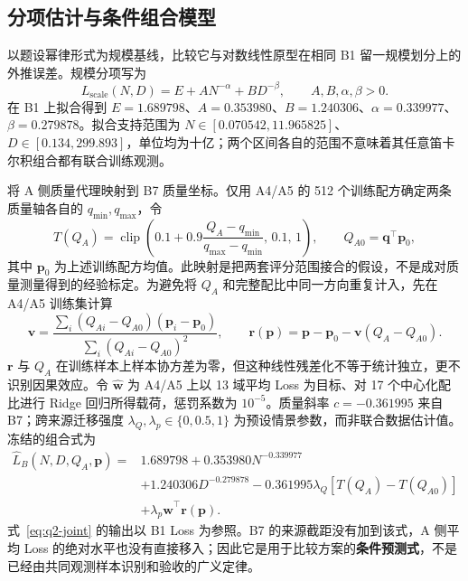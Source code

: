 \subsection{分项估计与条件组合模型}

以题设幂律形式为规模基线，比较它与对数线性原型在相同 B1 留一规模划分上的外推误差。规模分项写为
\begin{equation}
L_{\mathrm{scale}}(N,D)=E+AN^{-\alpha}+BD^{-\beta},\qquad A,B,\alpha,\beta>0.
\label{eq:q2-scale}
\end{equation}
在 B1 上拟合得到 $E=1.689798$、$A=0.353980$、$B=1.240306$、$\alpha=0.339977$、$\beta=0.279878$。拟合支持范围为 $N\in[0.070542,11.965825]$、$D\in[0.134,299.893]$，单位均为十亿；两个区间各自的范围不意味着其任意笛卡尔积组合都有联合训练观测。

将 A 侧质量代理映射到 B7 质量坐标。仅用 A4/A5 的 512 个训练配方确定两条质量轴各自的 $q_{\min},q_{\max}$，令
\begin{equation}
T(Q_A)=\operatorname{clip}\!\left(0.1+0.9\frac{Q_A-q_{\min}}{q_{\max}-q_{\min}},\,0.1,\,1\right),
\qquad Q_{A0}=\boldsymbol q^\top\boldsymbol p_0,
\label{eq:q2-map}
\end{equation}
其中 $\boldsymbol p_0$ 为上述训练配方均值。此映射是把两套评分范围接合的假设，不是成对质量测量得到的经验标定。为避免将 $Q_A$ 和完整配比中同一方向重复计入，先在 A4/A5 训练集计算
\begin{equation}
\boldsymbol v=\frac{\sum_i(Q_{Ai}-Q_{A0})(\boldsymbol p_i-\boldsymbol p_0)}
{\sum_i(Q_{Ai}-Q_{A0})^2},\qquad
\boldsymbol r(\boldsymbol p)=\boldsymbol p-\boldsymbol p_0-\boldsymbol v(Q_A-Q_{A0}).
\label{eq:q2-residual}
\end{equation}
$\boldsymbol r$ 与 $Q_A$ 在训练样本上样本协方差为零，但这种线性残差化不等于统计独立，更不识别因果效应。令 $\widehat{\boldsymbol w}$ 为 A4/A5 上以 13 域平均 Loss 为目标、对 17 个中心化配比进行 Ridge 回归所得载荷，惩罚系数为 $10^{-5}$。质量斜率 $c=-0.361995$ 来自 B7；跨来源迁移强度 $\lambda_Q,\lambda_p\in\{0,0.5,1\}$ 为预设情景参数，而非联合数据估计值。冻结的组合式为
\begin{equation}
\boxed{\begin{aligned}
\widehat L_B(N,D,Q_A,\boldsymbol p)
={}&1.689798+0.353980N^{-0.339977}\\
&+1.240306D^{-0.279878}-0.361995\lambda_Q[T(Q_A)-T(Q_{A0})]\\
&+\lambda_p\widehat{\boldsymbol w}^{\top}\boldsymbol r(\boldsymbol p).
\end{aligned}}
\label{eq:q2-joint}
\end{equation}
式~\eqref{eq:q2-joint} 的输出以 B1 Loss 为参照。B7 的来源截距没有加到该式，A 侧平均 Loss 的绝对水平也没有直接移入；因此它是用于比较方案的\textbf{条件预测式}，不是已经由共同观测样本识别和验收的广义定律。

